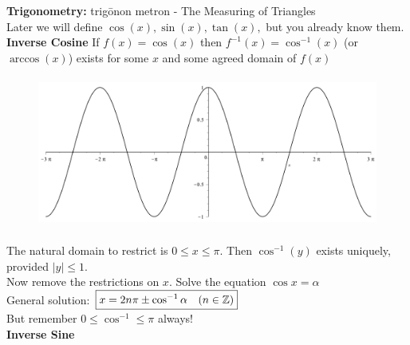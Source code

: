
\textbf{Trigonometry:} 
\greektext trigōnon metron 
\latintext - The Measuring of Triangles\\


Later we will define $\cos(x), \sin(x), \tan(x),$ but you already know them. \\


\textbf{Inverse Cosine}
If $f(x) = \cos(x)$ then $f^{-1}(x) = \cos^{-1}(x)$ (or $\arccos(x)$) exists for some $x$ and some agreed domain of $f(x)$\\

\begin{figure}[!htb]
\centering
\includegraphics[height=5cm]{cosx.png}
\label{fig:digraph}
\end{figure}

The natural domain to restrict is $0 \leq x \leq \pi$. Then $\cos^{-1}(y)$ exists uniquely, provided $|y| \leq 1$.\\

Now remove the restrictions on $x$. Solve the equation $\cos x = \alpha \qquad $\\

General solution: $\boxed{ x = 2n\pi \pm \cos^{-1}\alpha \quad (n \in \mathbb{Z})}$\\

But remember $0 \leq \cos^{-1} \leq \pi $ always!\\

\textbf{Inverse Sine}


\begin{figure}
  \begin{center}
\end{center}
\end{figure}



